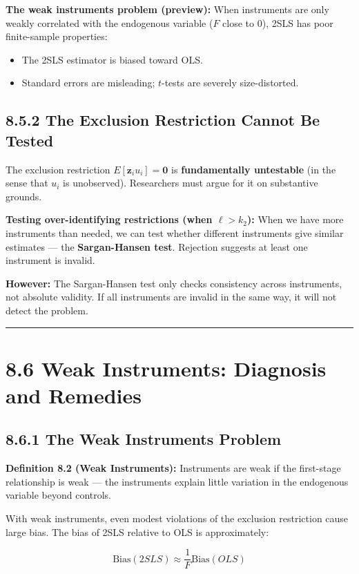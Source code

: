 \textbf{The weak instruments problem (preview):} When instruments are only weakly correlated with the endogenous variable ($F$ close to 0), 2SLS has poor finite-sample properties:
\begin{itemize}
\item The 2SLS estimator is biased toward OLS.
\item Standard errors are misleading; $t$-tests are severely size-distorted.
\end{itemize}

\subsection{8.5.2 The Exclusion Restriction Cannot Be Tested}

The exclusion restriction $E[\mathbf{z}_i u_i] = \mathbf{0}$ is \textbf{fundamentally untestable} (in the sense that $u_i$ is unobserved). Researchers must argue for it on substantive grounds.

\textbf{Testing over-identifying restrictions (when $\ell > k_2$):} When we have more instruments than needed, we can test whether different instruments give similar estimates --- the \textbf{Sargan-Hansen test}. Rejection suggests at least one instrument is invalid.

\textbf{However:} The Sargan-Hansen test only checks consistency across instruments, not absolute validity. If all instruments are invalid in the same way, it will not detect the problem.

\medskip\hrule\medskip

\section{8.6 Weak Instruments: Diagnosis and Remedies}

\subsection{8.6.1 The Weak Instruments Problem}

\textbf{Definition 8.2 (Weak Instruments):} Instruments are weak if the first-stage relationship is weak --- the instruments explain little variation in the endogenous variable beyond controls.

With weak instruments, even modest violations of the exclusion restriction cause large bias. The bias of 2SLS relative to OLS is approximately:

\[
\text{Bias}(2SLS) \approx \frac{1}{F}\text{Bias}(OLS)
\]

